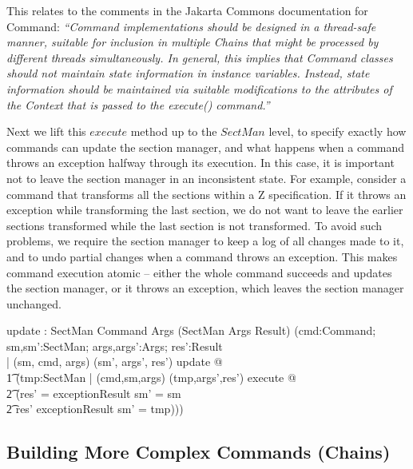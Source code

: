 \documentclass{llncs} %
\begin{document}
This relates to the comments in the Jakarta Commons documentation for
Command: \emph{``Command implementations should be designed in a
  thread-safe manner, suitable for inclusion in multiple Chains that might
  be processed by different threads simultaneously. In general, this
  implies that Command classes should not maintain state information in
  instance variables. Instead, state information should be maintained via
  suitable modifications to the attributes of the Context that is passed to
  the execute() command.''}


Next we lift this $execute$ method up to the $SectMan$ level,
to specify exactly how commands can update the section manager,
and what happens when a command throws an exception halfway
through its execution.  In this case, it is important not to
leave the section manager in an inconsistent state.  For example,
consider a command that transforms all the sections within a
Z specification.  If it throws an exception while transforming the
last section, we do not want to leave the earlier sections transformed
while the last section is not transformed.  To avoid such problems, we
require the section manager to keep a log of all changes made to it,
and to undo partial changes when a command throws an exception.
This makes command execution atomic -- either the whole command
succeeds and updates the section manager, or it throws an exception,
which leaves the section manager unchanged.

\begin{axdef}
  update : SectMan \cross Command \cross Args 
       \fun (SectMan \cross Args \cross Result)
\where
  (\forall cmd:Command; sm,sm':SectMan; args,args':Args; res':Result\\
  | (sm, cmd, args) \mapsto (sm', args', res') \in update @ \\
  \t1 (\exists tmp:SectMan 
           | (cmd,sm,args) \mapsto (tmp,args',res') \in execute @\\
  \t2   (res' = exceptionResult \land sm' = sm \lor \\
  \t2   \: res' \neq exceptionResult \land sm' = tmp)))
\end{axdef}


\subsection{Building More Complex Commands (Chains)}
\end{document}
